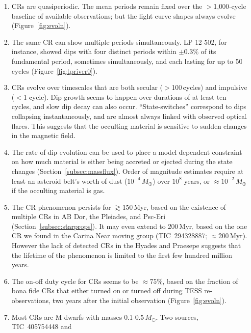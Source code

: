 \documentclass[11pt,twocolumn,tighten]{aastex63}
\begin{document}
\begin{enumerate}[leftmargin=*]
    \item CRs are quasiperiodic.  The mean periods remain fixed over
      the $>$1{,}000-cycle baseline of available observations; but the
      light curve shapes always evolve (Figure~\ref{fig:evoln}).
    \item The same CR can show multiple periods simultaneously.  LP
      12-502, for instance, showed dips with four distinct periods
      within $\pm 0.3\%$ of its fundamental period, sometimes
      simultaneously, and each lasting for up to 50 cycles
      (Figure~\ref{fig:lpriver0}).
    \item CRs evolve over timescales that are both secular
      ($>$100\,cycles) and impulsive ($<$1 cycle).  Dip growth seems
      to happen over durations of at least ten cycles, and slow dip
      decay can also occur.  ``State-switches'' correspond to dips 
      collapsing instantaneously, and are almost always linked with
      observed optical flares.  This suggests that the occulting
      material is sensitive to sudden changes in the magnetic field.
    \item The rate of dip evolution can be used to place a
      model-dependent constraint on how much material is either being
      accreted or ejected during the state changes
      (Section~\ref{subsec:massflux}).  Order of magnitude estimates
      require at least an asteroid belt's worth of dust
      ($10^{-4}$\,$M_\oplus$) over $10^8$ years, or
      $\approx$$10^{-2}$\,$M_\oplus$ if the occulting material is gas.
    \item The CR phenomenon persists for $\gtrsim$150\,Myr, based on
      the existence of multiple CRs in AB Dor, the Pleiades, and
      Psc-Eri (Section~\ref{subsec:starprops}).  It may even extend to
      200\,Myr, based on the one CR we found in the Carina Near
      moving group (TIC~294328887; $\approx$200\,Myr).  However the
      lack of detected CRs in the Hyades and Praesepe suggests that
      the lifetime of the phenomenon is limited to the first few
      hundred million years.
    \item The on-off duty cycle for CRs seems to be $\approx$$75$\%, based
      on the fraction of bona fide CRs that either turned on or turned
      off during TESS re-observations, two years after the initial
      observation (Figure~\ref{fig:evoln}).
    \item Most CRs are M dwarfs with masses
      0.1-0.5\,$M_\odot$.  Two sources, TIC~405754448 and

\end{enumerate}
\end{document}

